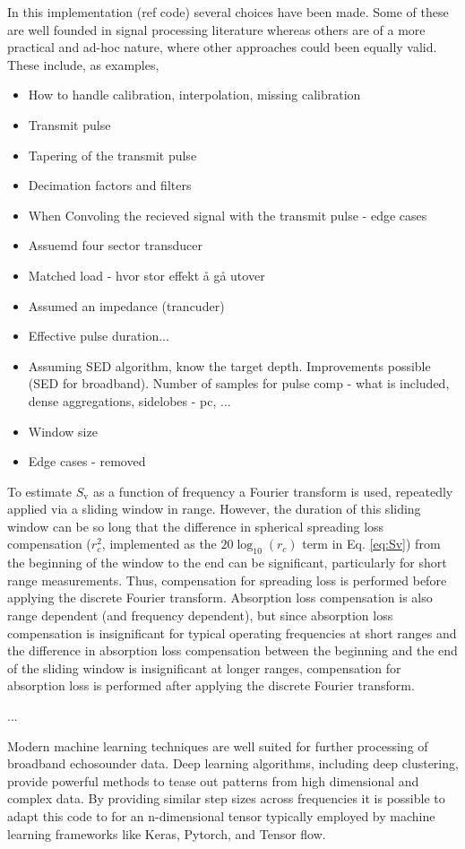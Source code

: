 \documentclass[preprint,12pt,TurnOnLineNumbers]{JASAnew}
\newcommand{\sv}{S_{\textrm{v}}}
\newcommand{\range}{r}
\begin{document}
In this implementation (ref code) several choices have been made. Some of these are well founded in signal processing literature whereas others are of a more practical and ad-hoc nature, where other approaches could been equally valid. These include, as examples,
\begin{itemize}
\item How to handle calibration, interpolation, missing calibration
\item Transmit pulse
\item Tapering of the transmit pulse
\item Decimation factors and filters
\item When Convoling the recieved signal with the transmit pulse - edge cases
\item Assuemd four sector transducer
\item Matched load - hvor stor effekt å gå utover 
\item Assumed an impedance (trancuder)
\item Effective pulse duration...
\item Assuming SED algorithm, know the target depth. Improvements possible (SED for broadband). Number of samples for pulse comp - what is included, dense aggregations, sidelobes - pc, ...
\item Window size
\item Edge cases - removed
\end{itemize}

To estimate $\sv$ as a function of frequency a Fourier transform is used, repeatedly applied via a sliding window in range. However, the duration of this sliding window can be so long that the difference in spherical spreading loss compensation ($r_c^2$, implemented as the $20\log_{10}(\range_c)$ term in Eq. \ref{eq:Sv}) from the beginning of the window to the end can be significant, particularly for short range measurements. Thus, compensation for spreading loss is performed before applying the discrete Fourier transform. Absorption loss compensation is also range dependent (and frequency dependent), but since absorption loss compensation is insignificant for typical operating frequencies at short ranges and the difference in absorption loss compensation between the beginning and the end of the sliding window is insignificant at longer ranges, compensation for absorption loss is performed after applying the discrete Fourier transform.

...

Modern machine learning techniques are well suited for further processing of broadband echosounder data. Deep learning algorithms, including deep clustering, provide powerful methods to tease out patterns from high dimensional and complex data. By providing similar step sizes across frequencies it is possible to adapt this code to for an n-dimensional tensor typically employed by machine learning frameworks like Keras, Pytorch, and Tensor flow. 
\end{document}
